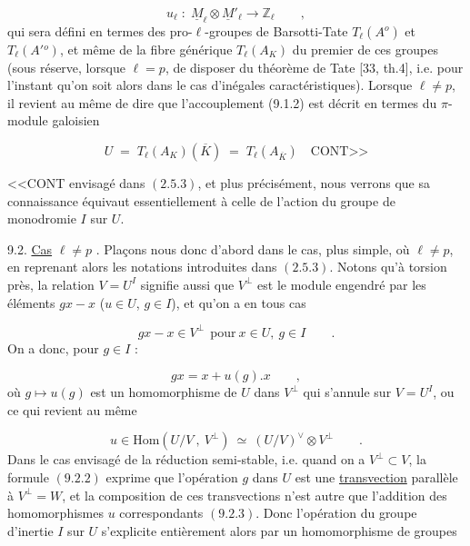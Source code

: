 \begin{equation}\tag{9.1.2}
u_{\ell} \;:\; \underline{M}_{\ell} \otimes \underline{M}'_{\ell} \longrightarrow \mathbb{Z}_{\ell} \qquad ,
\end{equation}
qui sera défini en termes des pro-$\ell$-groupes de Barsotti-Tate $T_{\ell}(A^{o})$ et $T_{\ell}(A'{}^{o})$, et même de la fibre générique $T_{\ell}(A_{K})$ du premier de ces groupes (sous réserve, lorsque $\ell=p$, de disposer du théorème de Tate [33, th.4], i.e. pour l'instant qu'on soit alors dans le cas d'inégales caractéristiques). Lorsque $\ell \neq p$, il revient au même de dire que l'accouplement (9.1.2) est décrit en termes du $\pi$-module galoisien

\begin{equation}\tag{9.1.3}
U \;=\; T_{\ell}(A_{K})(\overline{K}) \;=\; T_{\ell}(A_{\overline{K}}) \quad \text{CONT>>}
\end{equation}


<<CONT envisagé dans $(2.5.3)$, et plus précisément, nous verrons que sa connaissance équivaut essentiellement à celle de l'action du groupe de monodromie $I$ sur $U$.

9.2. \underline{Cas} $\ell \neq p$ . Plaçons nous donc d'abord dans le cas, plus simple, où $\ell \neq p$, en reprenant alors les notations introduites dans $(2.5.3)$. Notons qu'à torsion près, la relation $V = U^I$ signifie aussi que $V^{\perp}$ est le module engendré par les éléments $gx - x$ ($u \in U$, $g \in I$), et qu'on a en tous cas

\begin{equation}\tag{9.2.1}
gx - x \in V^{\perp} \ \ \mathrm{pour}\ x \in U,\ g \in I \qquad .
\end{equation}
On a donc, pour $g \in I$ :

\begin{equation}\tag{9.2.2}
gx = x + u(g).x \qquad ,
\end{equation}
où $g \longmapsto u(g)$ est un homomorphisme de $U$ dans $V^{\perp}$ qui s'annule sur $V= U^I$, ou ce qui revient au même

\begin{equation}\tag{9.2.3}
u \in \mathrm{Hom}(U/V\ ,\ V^{\perp}) \ \simeq\ (U/V)^{\vee} \otimes V^{\perp} \qquad .
\end{equation}
Dans le cas envisagé de la réduction semi-stable, i.e. quand on a $V^{\perp} \subset V$, la formule $(9.2.2)$ exprime que l'opération $g$ dans $U$ est une \underline{transvection} parallèle à $V^{\perp} = W$, et la composition de ces transvections n'est autre que l'addition des homomorphismes $u$ correspondants $(9.2.3)$. Donc l'opération du groupe d'inertie $I$ sur $U$ s'explicite entièrement alors par un homomorphisme de groupes

